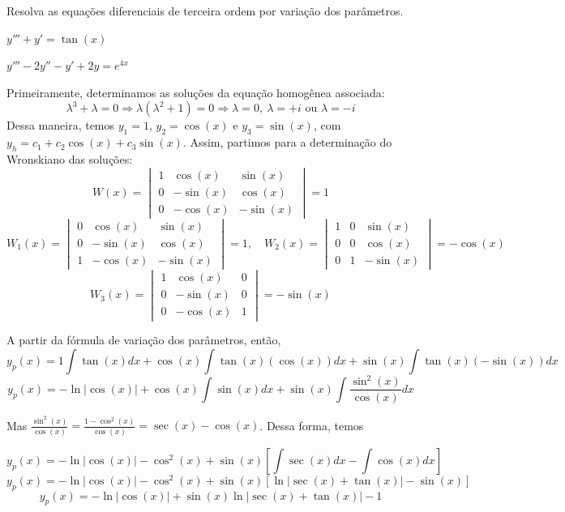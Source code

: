 \documentclass[oneside,12pt,a4paper]{report}
\begin{document}
 Resolva as equações diferenciais de terceira ordem por variação dos parâmetros.
\begin{itensquestao}[2]
    \item $y'''+y'=\tan(x)$
    \item $y'''-2y''-y'+2y=e^{4x}$
\end{itensquestao}

\begin{resolucao}
    
    \itemresolucao Primeiramente, determinamos as soluções da equação homogênea associada:
    \[\lambda^3+\lambda=0\Rightarrow\lambda(\lambda^2+1)=0\Rightarrow\lambda=0,~\lambda=+i\text{ ou }\lambda=-i\]
    Dessa maneira, temos $y_1=1$, $y_2=\cos(x)$ e $y_3=\sin(x)$, com $y_h=c_1+c_2\cos(x)+c_3\sin(x)$. Assim, partimos para a determinação do Wronskiano das soluções:
    \[W(x)=\begin{vmatrix}
        1 & \cos(x) & \sin(x)\\
        0 & -\sin(x) & \cos(x)\\
        0 & -\cos(x) & -\sin(x)
    \end{vmatrix}=1\]
    \[W_1(x)=\begin{vmatrix}
        0 & \cos(x) & \sin(x)\\
        0 & -\sin(x) & \cos(x)\\
        1 & -\cos(x) & -\sin(x)
    \end{vmatrix}=1, 
    \quad W_2(x)=\begin{vmatrix}
        1 & 0 & \sin(x)\\
        0 & 0 & \cos(x)\\
        0 & 1 & -\sin(x)
    \end{vmatrix}=-\cos(x)\]
    \[W_3(x)=\begin{vmatrix}
        1 & \cos(x) &  0\\
        0 & -\sin(x) & 0\\
        0 & -\cos(x) & 1
    \end{vmatrix}=-\sin(x)\]

    A partir da fórmula de variação dos parâmetros, então,
    \[y_p(x)=1\int\tan(x)dx+\cos(x)\int\tan(x)(\cos(x))dx+\sin(x)\int\tan(x)(-\sin(x))dx\]
    \[y_p(x)=-\ln|\cos(x)|+\cos(x)\int\sin(x)dx+\sin(x)\int\frac{\sin^2(x)}{\cos(x)}dx\]

    Mas $\displaystyle\frac{\sin^2(x)}{\cos(x)}=\frac{1-\cos^2(x)}{\cos(x)}=\sec(x)-\cos(x)$. Dessa forma, temos

    \[y_p(x)=-\ln|\cos(x)|-\cos^2(x)+\sin(x)\left[\int\sec(x)dx-\int\cos(x)dx\right]\]
    \[y_p(x)=-\ln|\cos(x)|-\cos^2(x)+\sin(x)\left[\ln|\sec(x)+\tan(x)|-\sin(x)\right]\]
    \[y_p(x)=-\ln|\cos(x)|+\sin(x)\ln|\sec(x)+\tan(x)|-1\]


\end{resolucao}
\end{document}
